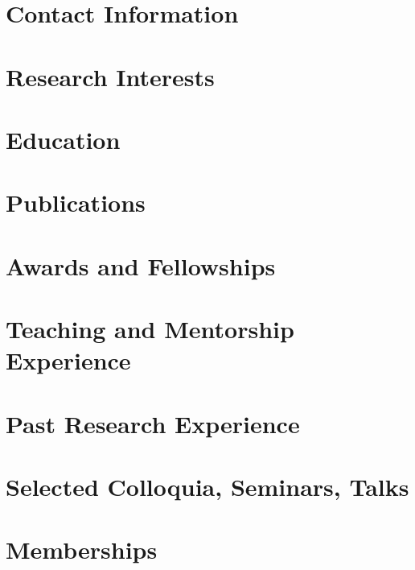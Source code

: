 \documentclass[margin,line]{res}
\begin{document}
\centerline{\LARGE {}}
\bigskip


\begin{resume}
\section{\sc Contact Information}
    
\section{\sc Research Interests}
    
\section{\sc Education}
    
\section{\sc Publications}
    
\section{\sc Awards and Fellowships}
    
\section{\sc Teaching and Mentorship Experience}
    
\section{\sc Past Research Experience}
    
\section{\sc Selected Colloquia, Seminars, Talks}
    
%     
%     
\section{\sc Memberships}
    

\end{resume}
\end{document}
